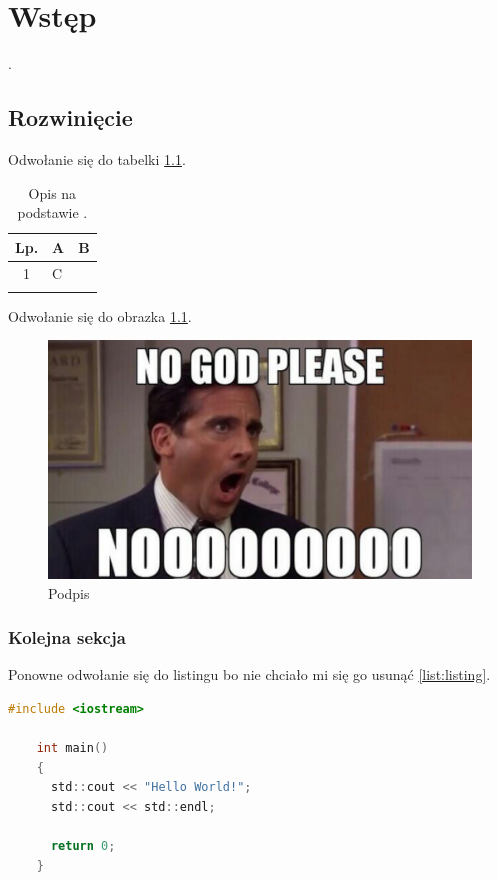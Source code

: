 \chapter{Wstęp}
\noindent \lipsum[2-4].

\section{Rozwinięcie}
\noindent \lipsum[5-6] Odwołanie się do tabelki \ref{tab:tabelka}.

\begin{longtable}{|c|p{4cm}|p{8cm}|}
	\hline
	\textbf{Lp.} &
	\textbf{A} &
	\textbf{B} \\ \hline\hline
	1 & C & \lipsum[7]\\
	\hline
	\caption{Opis na podstawie \cite{domain_tree_src}.}
	\label{tab:tabelka}
\end{longtable}

\lipsum[10-12] Odwołanie się do obrazka \ref{obrazek}.

\begin{center}
	\begin{figure}
	\centering
	\includegraphics[scale=0.3]{image/obrazek}
	\caption{Podpis}
	\label{obrazek}
	\end{figure}
\end{center}

\subsection{Kolejna sekcja}
\noindent \lipsum[12-13] Ponowne odwołanie się do listingu bo nie chciało mi się go usunąć \ref{list:listing}.

\begin{lstlisting}[label={list:listing},captionpos=b,caption=Przykładowy listing.,language=c]
	#include <iostream>

	int main()
	{
	  std::cout << "Hello World!";
	  std::cout << std::endl;

	  return 0;
	}
\end{lstlisting}
